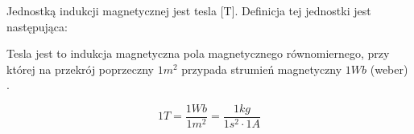 Jednostką indukcji magnetycznej jest tesla [T]. Definicja tej jednostki jest następująca:

\begin{defn}
	Tesla jest to indukcja magnetyczna pola magnetycznego równomiernego, przy której na przekrój poprzeczny $ 1 m^2 $ przypada strumień magnetyczny $ 1 Wb $ (weber) \cite{kaluszko}.
\end{defn}

\begin{equation} \label{eq:indmag5}
	1 T = \frac{1 Wb}{1 m^2} = \frac{1 kg}{1 s^2 \cdot 1 A}
\end{equation}







